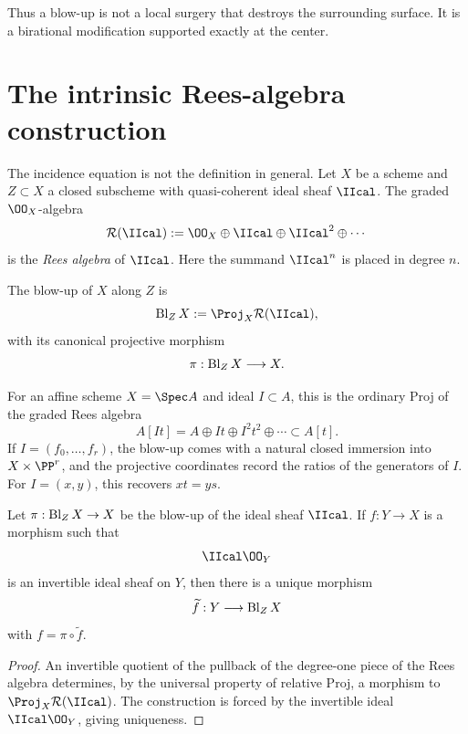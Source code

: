 Thus a blow-up is not a local surgery that destroys the surrounding surface.  It is a birational modification supported exactly at the center.



\section{The intrinsic Rees-algebra construction}

The incidence equation is not the definition in general.  Let \(X\) be a scheme and \(Z\subset X\) a closed subscheme with quasi-coherent ideal sheaf \(\IIcal\).  The graded \(\OO_X\)-algebra
\[
  \mathcal R(\IIcal)
  :=\OO_X\oplus\IIcal\oplus\IIcal^2\oplus\cdots
\]
is the \emph{Rees algebra} of \(\IIcal\).  Here the summand \(\IIcal^n\) is placed in degree \(n\).

\begin{definition}\label{def:vi45-rees-blowup}
The blow-up of \(X\) along \(Z\) is
\[
  \Bl_ZX:=\Proj_X\mathcal R(\IIcal),
\]
with its canonical projective morphism
\[
  \pi:\operatorname{Bl}_ZX\longrightarrow X.
\]
\end{definition}

For an affine scheme \(X=\Spec A\) and ideal \(I\subset A\), this is the ordinary Proj of the graded Rees algebra
\[
  A[It]=A\oplus It\oplus I^2t^2\oplus\cdots\subset A[t].
\]
If \(I=(f_0,\ldots,f_r)\), the blow-up comes with a natural closed immersion into \(X\times\PP^r\), and the projective coordinates record the ratios of the generators of \(I\).  For \(I=(x,y)\), this recovers \(xt=ys\).

\begin{theorem}\label{thm:vi45-universal-property}
Let \(\pi:\operatorname{Bl}_ZX\to X\) be the blow-up of the ideal sheaf \(\IIcal\).  If \(f:Y\to X\) is a morphism such that
\[
  \IIcal\OO_Y
\]
is an invertible ideal sheaf on \(Y\), then there is a unique morphism
\[
  \widetilde f:Y\longrightarrow\operatorname{Bl}_ZX
\]
with \(f=\pi\circ\widetilde f\).
\end{theorem}

\begin{proof}
An invertible quotient of the pullback of the degree-one piece of the Rees algebra determines, by the universal property of relative Proj, a morphism to \(\Proj_X\mathcal R(\IIcal)\).  The construction is forced by the invertible ideal \(\IIcal\OO_Y\), giving uniqueness.
\end{proof}

